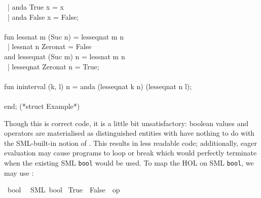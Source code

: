 \begin{isabellebody}
\begin{isamarkuptext}
\hspace*{0pt} ~| anda True x = x\\
\hspace*{0pt} ~| anda False x = False;\\
\hspace*{0pt}\\
\hspace*{0pt}fun less{}nat m (Suc n) = less{}eq{}nat m n\\
\hspace*{0pt} ~| less{}nat n Zero{}nat = False\\
\hspace*{0pt}and less{}eq{}nat (Suc m) n = less{}nat m n\\
\hspace*{0pt} ~| less{}eq{}nat Zero{}nat n = True;\\
\hspace*{0pt}\\
\hspace*{0pt}fun in{}interval (k, l) n = anda (less{}eq{}nat k n) (less{}eq{}nat n l);\\
\hspace*{0pt}\\
\hspace*{0pt}end; (*struct Example*)%
\end{isamarkuptext}%
\isamarkuptrue%
%
\endisatagquote
{\isafoldquote}%
%
\isadelimquote
%
\endisadelimquote
%
\begin{isamarkuptext}%
\noindent Though this is correct code, it is a little bit unsatisfactory:
  boolean values and operators are materialised as distinguished
  entities with have nothing to do with the SML-built-in notion
  of .  This results in less readable code;
  additionally, eager evaluation may cause programs to
  loop or break which would perfectly terminate when
  the existing SML \verb|bool| would be used.  To map
  the HOL  on SML \verb|bool|, we may use
  :%
\end{isamarkuptext}%
\isamarkuptrue%
%
\isadelimquotett
%
\endisadelimquotett
%
\isatagquotett
{}\isamarkupfalse%
\ bool\isanewline
\ \ {\isacharparenleft}SML\ {\isachardoublequoteopen}bool{\isachardoublequoteclose}{\isacharparenright}\isanewline
{}\isamarkupfalse%
\ True\ \ False\ \ {\isachardoublequoteopen}op\ {\isasymand}{\isachardoublequoteclose}\isanewline

\end{isabellebody}
